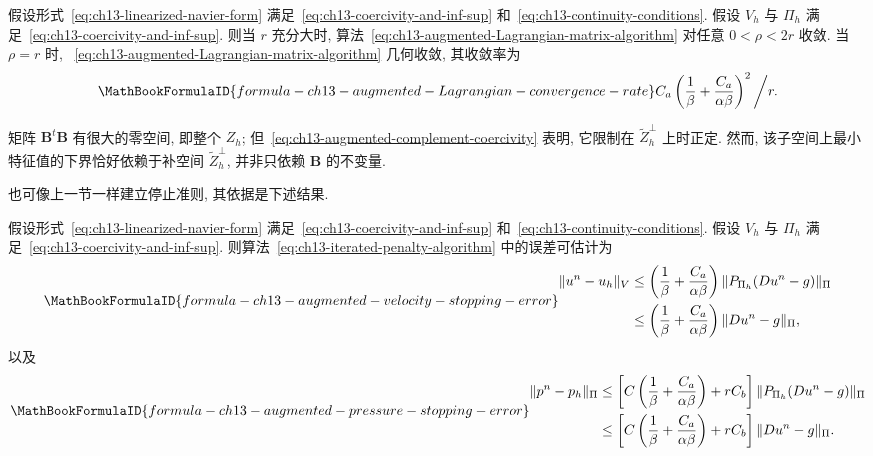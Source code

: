 \begin{Theorem}
\label{thm:ch13-augmented-Lagrangian-convergence}
假设形式~\eqref{eq:ch13-linearized-navier-form} 满足~\eqref{eq:ch13-coercivity-and-inf-sup} 和~\eqref{eq:ch13-continuity-conditions}. 假设 $V_h$ 与 $\Pi_h$ 满足~\eqref{eq:ch13-coercivity-and-inf-sup}. 则当 $r$ 充分大时, 算法~\eqref{eq:ch13-augmented-Lagrangian-matrix-algorithm} 对任意 $0<\rho<2r$ 收敛. 当 $\rho=r$ 时, ~\eqref{eq:ch13-augmented-Lagrangian-matrix-algorithm} 几何收敛, 其收敛率为
\[
\MathBookFormulaID{formula-ch13-augmented-Lagrangian-convergence-rate}
C_a\left(\frac1\beta+\frac{C_a}{\alpha\beta}\right)^2\bigg/r.
\]
\end{Theorem}

\begin{Remark}
\label{rem:ch13-augmented-matrix-nullspace}
矩阵 $\mathbf B^t\mathbf B$ 有很大的零空间, 即整个 $Z_h$; 但~\eqref{eq:ch13-augmented-complement-coercivity} 表明, 它限制在 $\widetilde Z_h^\perp$ 上时正定. 然而, 该子空间上最小特征值的下界恰好依赖于补空间 $\widetilde Z_h^\perp$, 并非只依赖 $\mathbf B$ 的不变量.
\end{Remark}

也可像上一节一样建立停止准则, 其依据是下述结果.

\begin{Theorem}
\label{thm:ch13-augmented-Lagrangian-stopping-errors}
假设形式~\eqref{eq:ch13-linearized-navier-form} 满足~\eqref{eq:ch13-coercivity-and-inf-sup} 和~\eqref{eq:ch13-continuity-conditions}. 假设 $V_h$ 与 $\Pi_h$ 满足~\eqref{eq:ch13-coercivity-and-inf-sup}. 则算法~\eqref{eq:ch13-iterated-penalty-algorithm} 中的误差可估计为
\begin{equation}
\MathBookFormulaID{formula-ch13-augmented-velocity-stopping-error}
\label{eq:ch13-augmented-velocity-stopping-error}
\begin{aligned}
\|u^n-u_h\|_V
&\leq\left(\frac1\beta+\frac{C_a}{\alpha\beta}\right)
\|P_{\Pi_h}(Du^n-g)\|_\Pi\\
&\leq\left(\frac1\beta+\frac{C_a}{\alpha\beta}\right)
\|Du^n-g\|_\Pi,
\end{aligned}
\end{equation}
以及
\begin{equation}
\MathBookFormulaID{formula-ch13-augmented-pressure-stopping-error}
\label{eq:ch13-augmented-pressure-stopping-error}
\begin{aligned}
\|p^n-p_h\|_\Pi
&\leq\left[C\left(\frac1\beta+\frac{C_a}{\alpha\beta}\right)+rC_b\right]
\|P_{\Pi_h}(Du^n-g)\|_\Pi\\
&\leq\left[C\left(\frac1\beta+\frac{C_a}{\alpha\beta}\right)+rC_b\right]
\|Du^n-g\|_\Pi.
\end{aligned}
\end{equation}
\end{Theorem}

